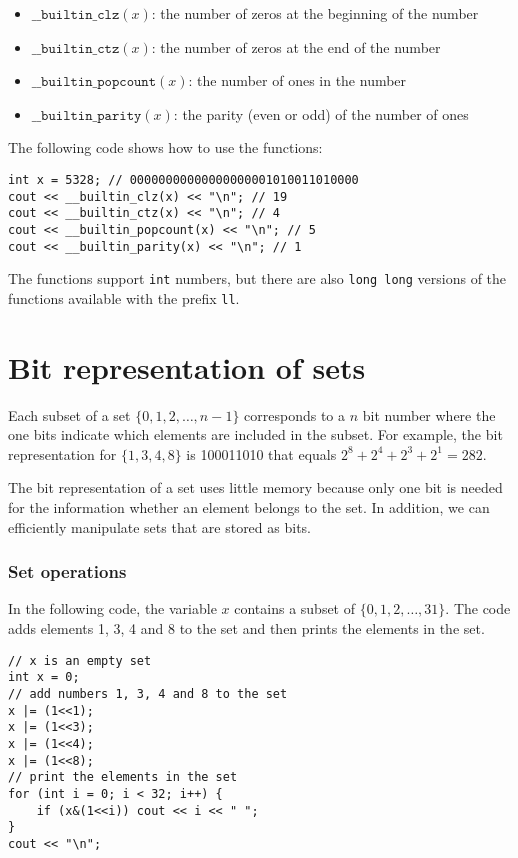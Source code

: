 \begin{itemize}
\item
$\texttt{\_\_builtin\_clz}(x)$:
the number of zeros at the beginning of the number
\item
$\texttt{\_\_builtin\_ctz}(x)$:
the number of zeros at the end of the number
\item
$\texttt{\_\_builtin\_popcount}(x)$:
the number of ones in the number
\item
$\texttt{\_\_builtin\_parity}(x)$:
the parity (even or odd) of the number of ones
\end{itemize}
\begin{samepage}

The following code shows how to use the functions:
\begin{lstlisting}
int x = 5328; // 00000000000000000001010011010000
cout << __builtin_clz(x) << "\n"; // 19
cout << __builtin_ctz(x) << "\n"; // 4
cout << __builtin_popcount(x) << "\n"; // 5
cout << __builtin_parity(x) << "\n"; // 1
\end{lstlisting}
\end{samepage}

The functions support \texttt{int} numbers,
but there are also \texttt{long long} versions
of the functions
available with the prefix \texttt{ll}.

\section{Bit representation of sets}

Each subset of a set $\{0,1,2,\ldots,n-1\}$
corresponds to a $n$ bit number
where the one bits indicate which elements
are included in the subset.
For example, the bit representation for $\{1,3,4,8\}$
is 100011010 that equals $2^8+2^4+2^3+2^1=282$.

The bit representation of a set uses little memory
because only one bit is needed for the information
whether an element belongs to the set.
In addition, we can efficiently manipulate sets
that are stored as bits.

\subsubsection{Set operations}

In the following code, the variable $x$
contains a subset of $\{0,1,2,\ldots,31\}$.
The code adds elements 1, 3, 4 and 8
to the set and then prints the elements in the set.

\begin{lstlisting}
// x is an empty set
int x = 0;
// add numbers 1, 3, 4 and 8 to the set
x |= (1<<1);
x |= (1<<3);
x |= (1<<4);
x |= (1<<8);
// print the elements in the set
for (int i = 0; i < 32; i++) {
    if (x&(1<<i)) cout << i << " ";
}
cout << "\n";
\end{lstlisting}

